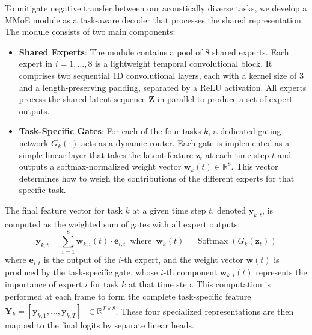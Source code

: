 \documentclass{article}
\begin{document}
To mitigate negative transfer between our acoustically diverse tasks, we develop a MMoE module \cite{ma2018mmoe} as a task-aware decoder that processes the shared representation. The module consists of two main components:
\begin{itemize}[noitemsep, topsep=1pt, leftmargin=*, labelsep=0.4em]
\item \textbf{Shared Experts}: The module contains a pool of 8 shared experts. Each expert in $i=1, \dots, 8$ is a lightweight temporal convolutional block. It comprises two sequential 1D convolutional layers, each with a kernel size of 3 and a length-preserving padding, separated by a ReLU activation. All experts process the shared latent sequence $\mathbf{Z}$ in parallel to produce a set of expert outputs.
\item \textbf{Task-Specific Gates}: For each of the four tasks $k$, a dedicated gating network $G_k(\cdot)$ acts as a dynamic router. Each gate is implemented as a simple linear layer that takes the latent feature $\mathbf{z}_t$ at each time step $t$ and outputs a softmax-normalized weight vector $\mathbf{w}_k(t) \in \mathbb{R}^8$. This vector determines how to weigh the contributions of the different experts for that specific task.
\end{itemize}
The final feature vector for task $k$ at a given time step $t$, denoted $\mathbf{y}_{k,t}$, is computed as the weighted sum of gates with all expert outputs:
\begin{equation}
\mathbf{y}_{k,t} = \sum_{i=1}^{8} \mathbf{w}_{k,i}(t) \cdot \mathbf{e}_{i,t} \,\,\, \text{where} \,\,\, \mathbf{w}_k(t) = \operatorname{Softmax}(G_k(\mathbf{z}_t))
\label{eq:mmoe_corrected}
\end{equation}
where $\mathbf{e}_{i,t}$ is the output of the $i$-th expert, and the weight vector $\mathbf{w}(t)$ is produced by the task-specific gate, whose $i$-th component $\mathbf{w}_{k,i}(t)$ represents the importance of expert $i$ for task $k$ at that time step. This computation is performed at each frame to form the complete task-specific feature $\mathbf{Y}_k = [\mathbf{y}_{k,1}, \dots, \mathbf{y}_{k,T}]^\top \in \mathbb{R}^{T \times 8}$. These four specialized representations are then mapped to the final logits by separate linear heads.
\end{document}
